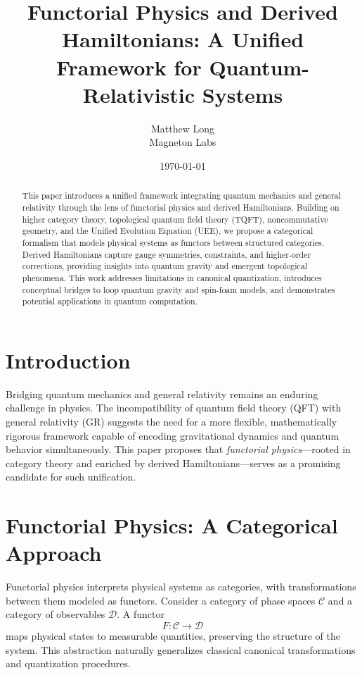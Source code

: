 \documentclass[12pt]{article}
\title{Functorial Physics and Derived Hamiltonians: A Unified Framework for Quantum-Relativistic Systems}
\author{Matthew Long \\ Magneton Labs}
\date{\today}
\begin{document}
\maketitle

\begin{abstract}
This paper introduces a unified framework integrating quantum mechanics and general relativity through the lens of functorial physics and derived Hamiltonians. Building on higher category theory, topological quantum field theory (TQFT), noncommutative geometry, and the Unified Evolution Equation (UEE), we propose a categorical formalism that models physical systems as functors between structured categories. Derived Hamiltonians capture gauge symmetries, constraints, and higher-order corrections, providing insights into quantum gravity and emergent topological phenomena. This work addresses limitations in canonical quantization, introduces conceptual bridges to loop quantum gravity and spin-foam models, and demonstrates potential applications in quantum computation.
\end{abstract}

\tableofcontents

\section{Introduction}
Bridging quantum mechanics and general relativity remains an enduring challenge in physics. The incompatibility of quantum field theory (QFT) with general relativity (GR) suggests the need for a more flexible, mathematically rigorous framework capable of encoding gravitational dynamics and quantum behavior simultaneously. This paper proposes that \textit{functorial physics}—rooted in category theory and enriched by derived Hamiltonians—serves as a promising candidate for such unification.

\section{Functorial Physics: A Categorical Approach}
Functorial physics interprets physical systems as categories, with transformations between them modeled as functors. Consider a category of phase spaces \( \mathcal{C} \) and a category of observables \( \mathcal{D} \). A functor
\begin{equation}
F: \mathcal{C} \to \mathcal{D}
\end{equation}
maps physical states to measurable quantities, preserving the structure of the system. This abstraction naturally generalizes classical canonical transformations and quantization procedures.
\end{document}
